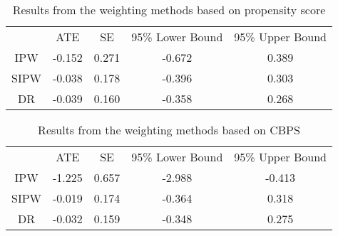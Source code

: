 \documentclass{article}
\begin{document}
\begin{table}[t]
\caption{Results from the weighting methods based on propensity score} \label{tb3}
\footnotesize
   \centering
{\tabcolsep=22pt
\begin{tabular}{c||c|c|c|c}
\hline
     & ATE    & SE    & 95\% Lower Bound & 95\% Upper Bound \\ \hhline{=#=|=|=|=}
IPW  & -0.152 & 0.271 & -0.672      & 0.389       \\ \hline
SIPW & -0.038 & 0.178 & -0.396      & 0.303       \\ \hline
DR   & -0.039 & 0.160 & -0.358      & 0.268       \\ \hline
\end{tabular}}
\end{table}

\begin{table}[t]
\caption{Results from the weighting methods based on CBPS} \label{tb4}
\footnotesize
   \centering
{\tabcolsep=22pt
\begin{tabular}{c||c|c|c|c}
\hline
     & ATE    & SE    & 95\% Lower Bound & 95\% Upper Bound \\ \hhline{=#=|=|=|=}
IPW  & -1.225 & 0.657 & -2.988      & -0.413      \\ \hline
SIPW & -0.019 & 0.174 & -0.364      & 0.318       \\ \hline
DR   & -0.032 & 0.159 & -0.348     & 0.275       \\ \hline
\end{tabular}}
\end{table}
\end{document}
